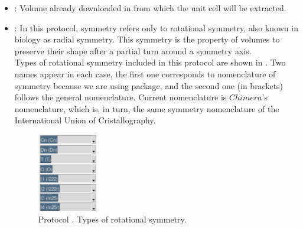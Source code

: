 \begin{itemize}
  \begin{itemize}
  \item {}: Volume already downloaded in \scipion from which the unit cell will be extracted.\\
  \item {}: In this protocol, symmetry refers only to rotational symmetry, also known in biology as radial symmetry. This symmetry is the property of volumes to preserve their shape after a partial turn around a symmetry axis.  \\
  Types of rotational symmetry included in this protocol are shown in . Two names appear in each case, the first one corresponds to  nomenclature of symmetry because we are using  package, and the second one (in brackets) follows the general \scipion nomenclature. Current \scipion nomenclature is $Chimera$'s nomenclature, which is, in turn, the same symmetry nomenclature of the International Union of Cristallography. \\
  
    \begin{figure}[H]
    \centering 
    \captionsetup{width=.7\linewidth} 
    \includegraphics[width=0.25\textwidth]{Images_appendix/Fig108.pdf}
    \caption{Protocol . Types of rotational symmetry.}
    \label{fig:app_protocol_extractUnitCell_2}
   \end{figure}
   

\end{itemize}
\end{itemize}
